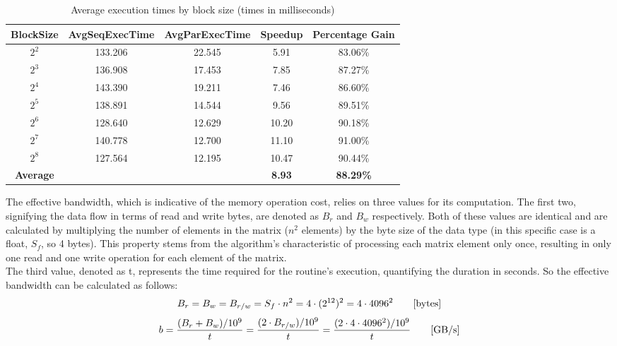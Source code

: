 \documentclass{article}
\begin{document}
\begin{table}[h!tb]
    \centering
    \caption{Average execution times by block size (times in milliseconds)}
    \begin{tabular}{@{} c c c c c @{}}
    \toprule
        \textbf{BlockSize} & \textbf{AvgSeqExecTime} & \textbf{AvgParExecTime} & \textbf{Speedup} & \textbf{Percentage Gain}\\
        \midrule
        $2^2$ & 133.206 & 22.545 & 5.91 & 83.06\%\\
    \lightrule
        $2^3$ & 136.908 & 17.453 & 7.85 & 87.27\%\\
    \lightrule
        $2^4$ & 143.390 & 19.211 & 7.46 & 86.60\%\\
    \lightrule
        $2^5$ & 138.891 & 14.544 & 9.56 & 89.51\%\\
    \lightrule
        $2^6$ & 128.640 & 12.629 & 10.20 & 90.18\%\\
    \lightrule
        $2^7$ & 140.778 & 12.700 & 11.10 & 91.00\%\\
    \lightrule
        $2^8$ & 127.564 & 12.195 & 10.47 & 90.44\%\\
    \midrule
        \textbf{Average} & & & \textbf{8.93} & \textbf{88.29\%}\\
    \bottomrule
    \end{tabular}
    \end{table}

The effective bandwidth, which is indicative of the memory operation cost, relies on three values for its computation. %
The first two, signifying the data flow in terms of read and write bytes, are denoted as $B_r$ and $B_w$ respectively. %
Both of these values are identical and are calculated by multiplying the number of elements in the matrix ($n^2$ elements) by the byte size of the data type (in this specific case is a float, $S_f$, so 4 bytes).
This property stems from the algorithm's characteristic of processing each matrix element only once, resulting in only one read and one write operation for each element of the matrix.\\
The third value, denoted as t, represents the time required for the routine's execution, quantifying the duration in seconds. So the effective bandwidth can be calculated as follows:
\begin{equation}
    B_r = B_w = B_{r/w} = S_f \cdot n^2 = 4 \cdot (2^{12})^2 = 4 \cdot 4096^2\qquad[\textnormal{bytes}]
\end{equation}
\begin{equation}
    b=\frac{(B_r+B_w)/10^9}{t}=\frac{(2 \cdot B_{r/w})/10^9}{t}=\frac{(2 \cdot 4 \cdot 4096^2)/10^9}{t}\qquad[\textnormal{GB/s}]
\end{equation}
\end{document}
